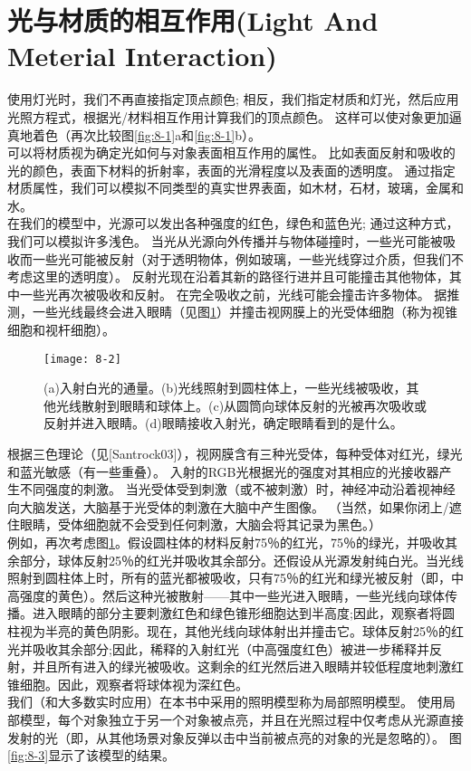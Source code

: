 \section{光与材质的相互作用(Light And Meterial Interaction)}
\begin{flushleft}
使用灯光时，我们不再直接指定顶点颜色; 相反，我们指定材质和灯光，然后应用光照方程式，根据光/材料相互作用计算我们的顶点颜色。 这样可以使对象更加逼真地着色（再次比较图\ref{fig:8-1}a和\ref{fig:8-1}b）。\\
可以将材质视为确定光如何与对象表面相互作用的属性。 比如表面反射和吸收的光的颜色，表面下材料的折射率，表面的光滑程度以及表面的透明度。 通过指定材质属性，我们可以模拟不同类型的真实世界表面，如木材，石材，玻璃，金属和水。\\
在我们的模型中，光源可以发出各种强度的红色，绿色和蓝色光; 通过这种方式，我们可以模拟许多浅色。 当光从光源向外传播并与物体碰撞时，一些光可能被吸收而一些光可能被反射（对于透明物体，例如玻璃，一些光线穿过介质，但我们不考虑这里的透明度）。 反射光现在沿着其新的路径行进并且可能撞击其他物体，其中一些光再次被吸收和反射。 在完全吸收之前，光线可能会撞击许多物体。 据推测，一些光线最终会进入眼睛（见图\ref{fig:8-2}）并撞击视网膜上的光受体细胞（称为视锥细胞和视杆细胞）。\\
\end{flushleft}

\begin{figure}[h]
    \label{fig:8-2}
    \texttt{[image: 8-2]}
    \centering
    \caption{(a)入射白光的通量。(b)光线照射到圆柱体上，一些光线被吸收，其他光线散射到眼睛和球体上。(c)从圆筒向球体反射的光被再次吸收或反射并进入眼睛。(d)眼睛接收入射光，确定眼睛看到的是什么。}
\end{figure}

\begin{flushleft}
根据三色理论（见[Santrock03]），视网膜含有三种光受体，每种受体对红光，绿光和蓝光敏感（有一些重叠）。 入射的RGB光根据光的强度对其相应的光接收器产生不同强度的刺激。 当光受体受到刺激（或不被刺激）时，神经冲动沿着视神经向大脑发送，大脑基于光受体的刺激在大脑中产生图像。 （当然，如果你闭上/遮住眼睛，受体细胞就不会受到任何刺激，大脑会将其记录为黑色。）\\

例如，再次考虑图\ref{fig:8-2}。假设圆柱体的材料反射75％的红光，75％的绿光，并吸收其余部分，球体反射25％的红光并吸收其余部分。还假设从光源发射纯白光。当光线照射到圆柱体上时，所有的蓝光都被吸收，只有75％的红光和绿光被反射（即，中高强度的黄色）。然后这种光被散射——其中一些光进入眼睛，一些光线向球体传播。进入眼睛的部分主要刺激红色和绿色锥形细胞达到半高度;因此，观察者将圆柱视为半亮的黄色阴影。现在，其他光线向球体射出并撞击它。球体反射25％的红光并吸收其余部分;因此，稀释的入射红光（中高强度红色）被进一步稀释并反射，并且所有进入的绿光被吸收。这剩余的红光然后进入眼睛并较低程度地刺激红锥细胞。因此，观察者将球体视为深红色。\\
我们（和大多数实时应用）在本书中采用的照明模型称为局部照明模型。 使用局部模型，每个对象独立于另一个对象被点亮，并且在光照过程中仅考虑从光源直接发射的光（即，从其他场景对象反弹以击中当前被点亮的对象的光是忽略的）。 图\ref{fig:8-3}显示了该模型的结果。
\end{flushleft}

